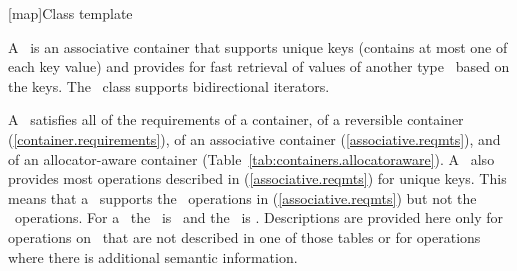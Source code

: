 \documentclass[american,twoside]{book}
\begin{document}
[map]{Class template }%

\pnum
A \ is an associative container that
supports unique keys (contains at most one of each key value) and
provides for fast retrieval of values of another type \ based
on the keys. The \ class supports bidirectional iterators.

\pnum
A
\
satisfies all of the requirements of a container, of a reversible container
(\ref{container.requirements}), of
an associative container (\ref{associative.reqmts}), and of an allocator-aware container (Table~\ref{tab:containers.allocatoraware}).
A
\
also provides most operations described in (\ref{associative.reqmts})
for unique keys.
This means that a
\
supports the
\
operations in (\ref{associative.reqmts})
but not the
\tcode{a_eq}\
operations.
For a
\tcode{map<Key,T>}\
the
\
is
\tcode{Key}\
and the
\
is
.
Descriptions are provided here only for operations on
\
that are not described in one of those tables
or for operations where there is additional semantic information.
\end{document}
